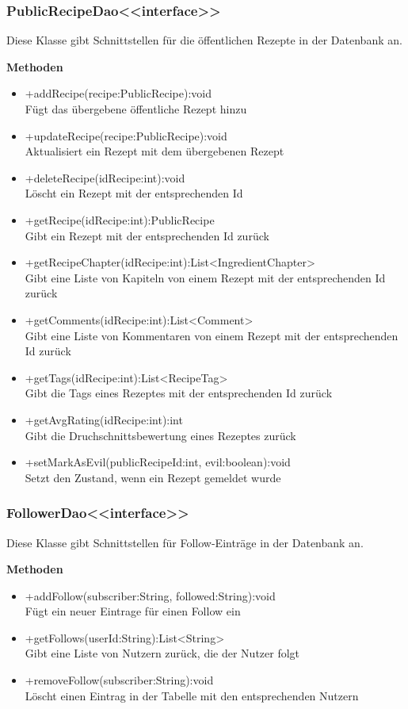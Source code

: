 \subsubsection{PublicRecipeDao<<interface>>}
Diese Klasse gibt Schnittstellen für die öffentlichen Rezepte in der Datenbank an.

\textbf{Methoden}
\begin{itemize}
	\item +addRecipe(recipe:PublicRecipe):void \\Fügt das übergebene öffentliche Rezept hinzu
	\item +updateRecipe(recipe:PublicRecipe):void \\Aktualisiert ein Rezept mit dem übergebenen Rezept
	\item +deleteRecipe(idRecipe:int):void \\Löscht ein Rezept mit der entsprechenden Id
	\item +getRecipe(idRecipe:int):PublicRecipe \\Gibt ein Rezept mit der entsprechenden Id zurück
	\item +getRecipeChapter(idRecipe:int):List<IngredientChapter> \\Gibt eine Liste von Kapiteln von einem Rezept mit der entsprechenden Id zurück
	\item +getComments(idRecipe:int):List<Comment> \\Gibt eine Liste von Kommentaren von einem Rezept mit der entsprechenden Id zurück
	\item +getTags(idRecipe:int):List<RecipeTag> \\Gibt die Tags eines Rezeptes mit der entsprechenden Id zurück
	\item +getAvgRating(idRecipe:int):int \\Gibt die Druchschnittsbewertung eines Rezeptes zurück
	\item +setMarkAsEvil(publicRecipeId:int, evil:boolean):void \\Setzt den Zustand, wenn ein Rezept gemeldet wurde
\end{itemize}

\subsubsection{FollowerDao<<interface>>}
Diese Klasse gibt Schnittstellen für Follow-Einträge in der Datenbank an.

\textbf{Methoden}
\begin{itemize}
	\item +addFollow(subscriber:String, followed:String):void \\Fügt ein neuer Eintrage für einen Follow ein
	\item +getFollows(userId:String):List<String> \\Gibt eine Liste von Nutzern zurück, die der Nutzer folgt
	\item +removeFollow(subscriber:String):void \\Löscht einen Eintrag in der Tabelle mit den entsprechenden Nutzern
\end{itemize}

